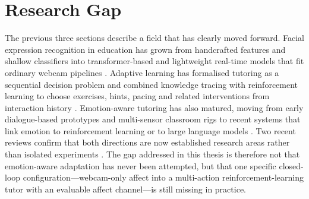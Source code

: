 \section{Research Gap}\label{sec:research_gap}

The previous three sections describe a field that has clearly moved forward. Facial expression recognition in education has grown from handcrafted features and shallow classifiers into transformer-based and lightweight real-time models that fit ordinary webcam pipelines \cite{lek_academic_2023,aly_revolutionizing_2025,aly_comprehensive_2025,liu_dynamic_2026}. Adaptive learning has formalised tutoring as a sequential decision problem and combined knowledge tracing with reinforcement learning to choose exercises, hints, pacing and related interventions from interaction history \cite{azoulay_adaptive_2021,fu_integrating_2025,kuling_ken_2025,axak_adaptive_nodate}. Emotion-aware tutoring has also matured, moving from early dialogue-based prototypes \cite{Graesser2004AutoTutorDialogue,dmello_integrating_2005} and multi-sensor classroom rigs \cite{woolf_affect-aware_2009,standen_evaluation_2020} to recent systems that link emotion to reinforcement learning or to large language models \cite{perez_emotions_2024,govea_implementation_2024,kong_real-time_2025,gong_design_2025,gutierrez_development_2025}. Two recent reviews confirm that both directions are now established research areas rather than isolated experiments \cite{fernandez-herrero_evaluating_2024,zerkouk_comprehensive_2025}. The gap addressed in this thesis is therefore not that emotion-aware adaptation has never been attempted, but that one specific closed-loop configuration---webcam-only affect into a multi-action reinforcement-learning tutor with an evaluable affect channel---is still missing in practice.

